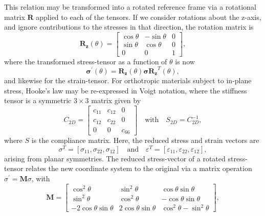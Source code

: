%
This relation may be transformed 
into a rotated reference frame 
via a rotational matrix $\boldsymbol{R}$ 
applied to each of the tensors.
%
If we consider rotations about the z-axis, 
and ignore contributions 
to the stresses in that direction, 
the rotation matrix is 
%
\begin{equation}
\boldsymbol{R_z}(\theta)=\left[\begin{array}{ccc}
\cos{\theta} & -\sin{\theta} & 0 \\
\sin{\theta} & \cos{\theta} & 0 \\
0 & 0&1
\end{array}
\right],
\end{equation}
%
where the transformed stress-tensor 
as a function of $\theta$ is now
%
\begin{equation}
\boldsymbol{\sigma^\prime}(\theta)=\boldsymbol{R_z}(\theta)\boldsymbol{\sigma}\boldsymbol{R_z}^T(\theta),
\end{equation}
%
and likewise for the strain-tensor.
%
For orthotropic materials 
subject to in-plane stress, 
Hooke's law may be re-expressed in Voigt notation, 
where the stiffness tensor is a 
symmetric $3\times3$ matrix given by
%
\begin{equation}
C_{2D}=\left[\begin{array}{ccc}
c_{11} & c_{12}  & 0 \\
c_{12} & c_{22}  & 0 \\
0 & 0  & c_{66}
\end{array}\right]
\quad
\text{with}
\quad
S_{2D}=C_{2D}^{-1},
\label{eq:2dmatrix}
\end{equation} 
where $S$ is the compliance matrix. 
%
Here, the reduced stress and strain vectors are 
%
\begin{equation}
\sigma^T=\left[\sigma_{11},\sigma_{22},\sigma_{12}\right]
\quad\mbox{and}\quad 
\varepsilon^T=\left[\varepsilon_{11},\varepsilon_{22},\varepsilon_{12}\right],
\end{equation}
arising from planar symmetries.
%
The reduced stress-vector 
of a rotated stress-tensor 
relates the new coordinate system 
to the original via a matrix operation  
$\sigma^\prime=\boldsymbol{M}\sigma$, 
with
\begin{equation}
%
\boldsymbol{M}
=
\left[\begin{array}{ccc}
\cos^2\theta& \sin^2\theta & \cos\theta\sin\theta\\
\sin^2\theta& \cos^2\theta&-\cos\theta\sin\theta\\
-2\cos\theta\sin\theta& 2\cos\theta\sin\theta & \cos^2\theta-\sin^2\theta
\end{array}\right],
\end{equation}
